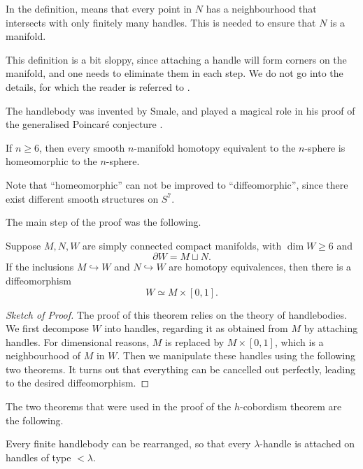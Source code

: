 In the definition,  means that 
every point in $N$ has a neighbourhood that intersects 
with only finitely many handles.
This is needed to ensure that $N$ is a manifold.

This definition is a bit sloppy,
since attaching a handle will form corners on the manifold,
and one needs to eliminate them in each step.
We do not go into the details,
for which the reader is referred to \cite{wall}.

The handlebody was invented by Smale,
and played a magical role in his proof of the
generalised Poincar\'e conjecture \cite{smale}.

\begin{theorem}
    If $n\geq6$, then every smooth $n$-manifold
    homotopy equivalent to the $n$-sphere
    is homeomorphic to the $n$-sphere.
\end{theorem}

Note that ``homeomorphic'' can not be improved to ``diffeomorphic'',
since there exist different smooth structures on $S^7$.

The main step of the proof was the following.

\begin{theorem}
    Suppose $M,N,W$ are simply connected compact manifolds, with $\dim W\geq6$ and 
    \[ \partial W = M \sqcup N. \]
    If the inclusions $M\hookrightarrow W$ and $N\hookrightarrow W$
    are homotopy equivalences, then there is a diffeomorphism
    \[ W \simeq M \times [0,1]. \]
\end{theorem}

\begin{proof}[Sketch of Proof]
    The proof of this theorem relies on the theory of handlebodies.
    We first decompose $W$ into handles,
    regarding it as obtained from $M$ by attaching handles.
    For dimensional reasons, $M$ is replaced by $M\times[0,1]$,
    which is a neighbourhood of $M$ in $W$.
    Then we manipulate these handles using the following two theorems.
    It turns out that everything can be cancelled out perfectly,
    leading to the desired diffeomorphism.
\end{proof}

The two theorems that were used in the proof 
of the $h$-cobordism theorem are the following.

\begin{theorem}[Rearrangement] \label{thm-rearrangement}
    Every finite handlebody can be rearranged,
    so that every $\lambda$-handle is attached on handles
    of type $<\lambda$.
\end{theorem}

